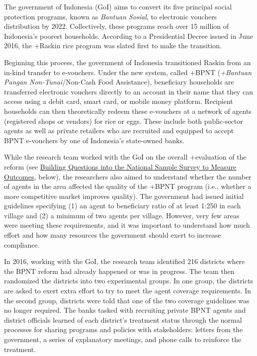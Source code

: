 \documentclass[
]{book}
\begin{document}
The government of Indonesia (GoI) aims to convert its five principal social protection programs, known as \emph{Bantuan Sosial}, to electronic vouchers distribution by 2022. Collectively, these programs reach over 15 million of Indonesia's poorest households. According to a Presidential Decree issued in June 2016, the +Raskin\textbar{} rice program was slated first to make the transition.

Beginning this process, the government of Indonesia transitioned Raskin from an in-kind transfer to e-vouchers. Under the new system, called +BPNT\textbar{} (\emph{+Bantuan Pangan Non-Tunai}/Non-Cash Food Assistance), beneficiary households are transferred electronic vouchers directly to an account in their name that they can access using a debit card, smart card, or mobile money platform. Recipient households can then theoretically redeem these e-vouchers at a network of agents (registered shops or vendors) for rice or eggs. These include both public-sector agents as well as private retailers who are recruited and equipped to accept BPNT e-vouchers by one of Indonesia's state-owned banks.

While the research team worked with the GoI on the overall +evaluation\textbar{} of the reform (see \protect\hyperlink{building-questions-into-the-national-sample-survey-to-measure-outcomes}{Building Questions into the National Sample Survey to Measure Outcomes}, below), the researchers also aimed to understand whether the number of agents in the area affected the quality of the +BPNT\textbar{} program (i.e., whether a more competitive market improves quality). The government had issued initial guidelines specifying (1) an agent to beneficiary ratio of at least 1:250 in each village and (2) a minimum of two agents per village. However, very few areas were meeting these requirements, and it was important to understand how much effort and how many resources the government should exert to increase compliance.

In 2016, working with the GoI, the research team identified 216 districts where the BPNT reform had already happened or was in progress. The team then randomized the districts into two experimental groups. In one group, the districts are asked to exert extra effort to try to meet the agent coverage requirements. In the second group, districts were told that one of the two coverage guidelines was no longer required. The banks tasked with recruiting private BPNT agents and district officials learned of each district's treatment status through the normal processes for sharing programs and policies with stakeholders: letters from the government, a series of explanatory meetings, and phone calls to reinforce the treatment.
\end{document}

